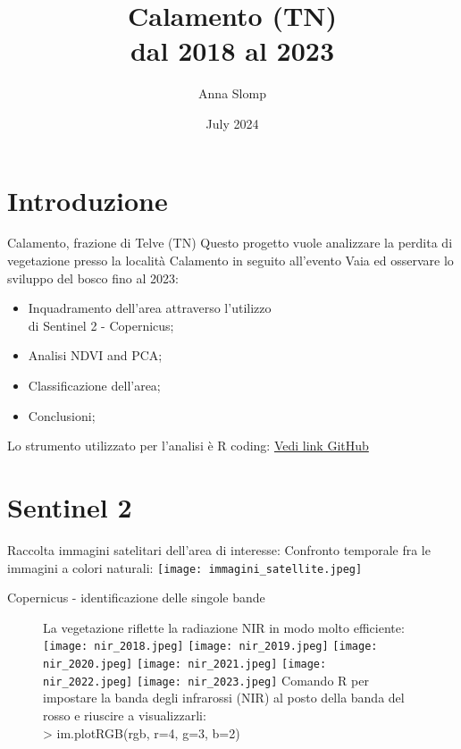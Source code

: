 \documentclass[10pt]{beamer}
\title{Calamento (TN)\\
dal 2018 al 2023}
\author{Anna Slomp}
\date{July 2024}
\begin{document}
\maketitle


\section{Introduzione}
\begin{frame}{Calamento, frazione di Telve (TN)}
Questo progetto vuole analizzare la perdita di vegetazione presso la località Calamento in seguito all'evento Vaia ed osservare lo sviluppo del bosco fino al 2023:
\begin{itemize}
    \item Inquadramento dell'area attraverso l'utilizzo\\
    di Sentinel 2 - Copernicus;
    \item Analisi NDVI and PCA; 
    \item Classificazione dell'area;
    \item Conclusioni;
\end{itemize}
Lo strumento utilizzato per l'analisi è R coding:
\href{https://github.com/DM001-1/telerilevamento_23_24/blob/main/R_script_exam.R}{Vedi link GitHub}
\end{frame}    

\section{Sentinel 2}
\begin{frame}{Raccolta immagini satelitari dell'area di interesse:}
Confronto temporale fra le immagini a colori naturali: 
\texttt{[image: immagini\_satellite.jpeg]}
\end{frame}

\begin{frame}{Copernicus - identificazione delle singole bande}
\begin{figure}
La vegetazione riflette la radiazione NIR in modo molto efficiente:
        \centering
        \texttt{[image: nir\_2018.jpeg]}
        \texttt{[image: nir\_2019.jpeg]} 
        \texttt{[image: nir\_2020.jpeg]}
        \texttt{[image: nir\_2021.jpeg]}
        \texttt{[image: nir\_2022.jpeg]} 
        \texttt{[image: nir\_2023.jpeg]}
Comando R per impostare la banda degli infrarossi (NIR) al posto della banda del rosso e riuscire a visualizzarli:\\ 
> im.plotRGB(rgb, r=4, g=3, b=2)
    \end{figure}
\end{frame}
\end{document}
